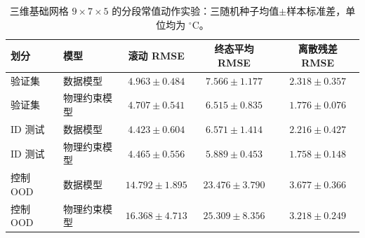 \begin{table}[htbp]
\centering
\small
\setlength{\tabcolsep}{4pt}
\caption{三维基础网格 $9\times7\times5$ 的分段常值动作实验：三随机种子均值$\pm$样本标准差，单位均为 $^\circ\mathrm{C}$。}
\label{tab:three-dimensional-zoh-base}
\begin{tabular}{llccc}
\toprule
划分 & 模型 & 滚动 RMSE & 终态平均 RMSE & 离散残差 RMSE \\
\midrule
验证集 & 数据模型 & $4.963\pm0.484$ & $7.566\pm1.177$ & $2.318\pm0.357$ \\
验证集 & 物理约束模型 & $4.707\pm0.541$ & $6.515\pm0.835$ & $1.776\pm0.076$ \\
ID 测试 & 数据模型 & $4.423\pm0.604$ & $6.571\pm1.414$ & $2.216\pm0.427$ \\
ID 测试 & 物理约束模型 & $4.465\pm0.556$ & $5.889\pm0.453$ & $1.758\pm0.148$ \\
控制 OOD & 数据模型 & $14.792\pm1.895$ & $23.476\pm3.790$ & $3.677\pm0.366$ \\
控制 OOD & 物理约束模型 & $16.368\pm4.713$ & $25.309\pm8.356$ & $3.218\pm0.249$ \\
\bottomrule
\end{tabular}
\end{table}
